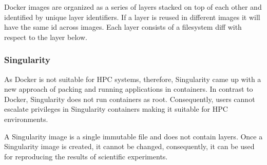 \documentclass[a4paper,num-refs]{oup-contemporary}
\begin{document}
Docker images are organized as a series of layers stacked on top of each
other and identified by unique layer identifiers. If a layer is reused
in different images it will
have the same id across images. Each layer consists of a filesystem diff
with respect to the layer below.

\subsubsection{Singularity}

As Docker is not suitable for HPC systems, therefore, Singularity came up with a new approach
of packing and running applications in containers. 
In contrast to Docker,
Singularity does not run containers as root. Consequently, users cannot escalate
privileges in Singularity containers making it suitable for HPC environments.

A Singularity image is a single immutable file and
does not contain layers.
Once a Singularity image is created, it cannot be changed, consequently,
it can be used for reproducing the results of scientific
experiments.
\end{document}
